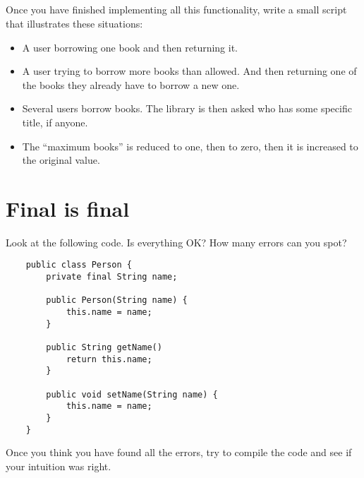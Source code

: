 \documentclass{article}
\begin{document}
\subsection{}

Once you have finished implementing all this functionality, write a
small script that illustrates these situations: 

\begin{itemize}
\item A user borrowing one book and then returning it.
\item A user trying to borrow more books than allowed. And then
  returning one of the books they already have to borrow a new one.
\item Several users borrow books. The library is then asked who has
  some specific title, if anyone. 
\item The ``maximum books'' is reduced to one, then to zero, then it
  is increased to the original value.  
\end{itemize}

\section{Final is final}
\label{sec:final-final}

Look at the following code. Is everything OK? How many errors can you spot?

\begin{verbatim}
    public class Person {
        private final String name;

        public Person(String name) {
            this.name = name;
        }

        public String getName()
            return this.name;
        }

        public void setName(String name) {
            this.name = name;
        }
    }
\end{verbatim}

Once you think you have found all the errors, try to compile the code
and see if your intuition was right. 
\end{document}
